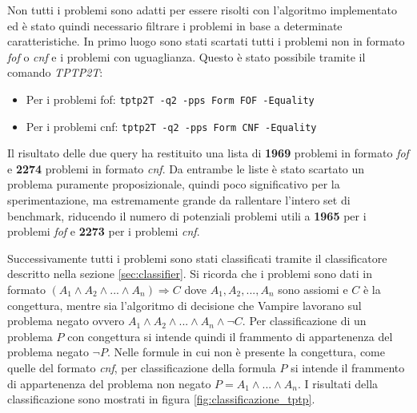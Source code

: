 \documentclass[./main.tex]{subfiles}
\begin{document}
Non tutti i problemi sono adatti per essere risolti con l'algoritmo implementato ed è 
stato quindi necessario filtrare i problemi in base a determinate caratteristiche.
In primo luogo sono stati scartati tutti i problemi non in formato \textit{fof} o \textit{cnf} e
i problemi con uguaglianza. Questo è stato possibile tramite il comando \textit{TPTP2T}:

\begin{itemize}
    \item Per i problemi fof: \texttt{tptp2T -q2 -pps Form FOF -Equality}
    \item Per i problemi cnf: \texttt{tptp2T -q2 -pps Form CNF -Equality}
\end{itemize}

Il risultato delle due query ha restituito una lista di \textbf{1969} problemi in formato \textit{fof} e
\textbf{2274} problemi in formato \textit{cnf}. 
Da entrambe le liste è stato scartato un problema puramente proposizionale,
quindi poco significativo per la sperimentazione, ma estremamente grande da rallentare l'intero set di benchmark,
riducendo il numero di potenziali problemi utili a \textbf{1965} per i problemi \textit{fof} e \textbf{2273} per i problemi \textit{cnf}.

Successivamente tutti i problemi sono stati classificati tramite il classificatore descritto nella sezione \ref{sec:classifier}.
Si ricorda che i problemi sono dati in formato $(A_1 \land A_2 \land ... \land A_n) \Rightarrow C$ dove 
$A_1, A_2, ..., A_n$ sono assiomi e $C$ è la congettura, mentre 
sia l'algoritmo di decisione che Vampire lavorano sul problema negato ovvero $A_1 \land A_2 \land ... \land A_n \land \lnot C$.
Per classificazione di un problema $P$ con congettura si intende quindi il frammento di appartenenza del problema negato $\lnot P$.
Nelle formule in cui non è presente la congettura, come quelle del formato \textit{cnf}, per classificazione della formula $P$ si intende il frammento di appartenenza del
problema non negato $P = A_1 \land ... \land A_n$.
I risultati della classificazione sono mostrati in figura \ref{fig:classificazione_tptp}.
\end{document}
